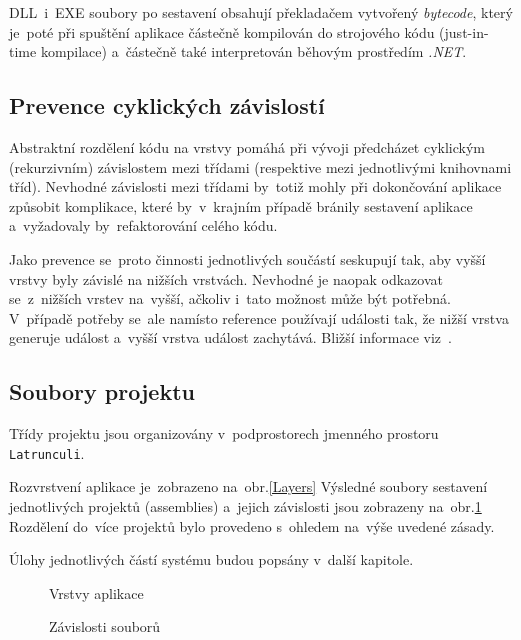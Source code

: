 \documentclass[12pt]{article}
\begin{document}
DLL~i~EXE soubory po sestavení obsahují překladačem vytvořený \emph{bytecode}, který je~poté při spuštění aplikace částečně kompilován do strojového kódu (just-in-time kompilace) a~částečně také interpretován běhovým prostředím \emph{.NET}.

\subsection{Prevence cyklických závislostí}
Abstraktní rozdělení kódu na vrstvy pomáhá při vývoji předcházet cyklickým (rekurzivním) závislostem mezi třídami (respektive mezi jednotlivými knihovnami tříd). Nevhodné závislosti mezi třídami by~totiž mohly při dokončování aplikace způsobit komplikace, které by~v~krajním případě bránily sestavení aplikace a~vyžadovaly by~refaktorování celého kódu.

Jako prevence se~proto činnosti jednotlivých součástí seskupují tak, aby vyšší vrstvy byly závislé na nižších vrstvách. Nevhodné je naopak odkazovat se~z~nižších vrstev na~vyšší, ačkoliv i~tato možnost může být potřebná. V~případě potřeby se~ale namísto reference používají události tak, že nižší vrstva generuje událost a~vyšší vrstva událost zachytává. Bližší informace viz~\cite{wlaschin1}.

\subsection{Soubory projektu}
Třídy projektu jsou organizovány v~podprostorech jmenného prostoru \texttt{Latrunculi}. 

Rozvrstvení aplikace je~zobrazeno na~obr.\ref{Layers} Výsledné soubory sestavení jednotlivých projektů (assemblies) a~jejich závislosti jsou zobrazeny na~obr.\ref{Assemblies} Rozdělení do~více projektů bylo provedeno s~ohledem na~výše uvedené zásady.

Úlohy jednotlivých částí systému budou popsány v~další kapitole.

\begin{figure}[ht]
  \centering
  \begin{minipage}[b]{0.4\textwidth}
		\caption{Vrstvy aplikace}
		\label{Layers}
  \end{minipage}
  \hfill
  \begin{minipage}[b]{0.4\textwidth}
		\epsfysize=70mm
		\caption{Závislosti souborů}
		\label{Assemblies}
  \end{minipage}
\end{figure}
\end{document}
